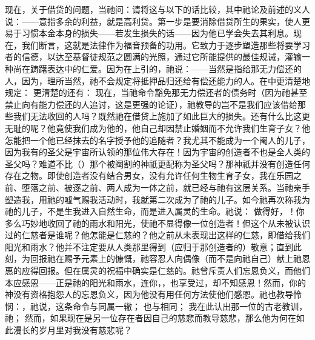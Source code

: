 现在，关于借贷的问题，当祂问：请将这与以下的话比较，其中祂论及前述的义人说：——意指多余的利益，就是高利贷。第一步是要消除借贷所生的果实，使人更易于习惯本金本身的损失——若发生损失的话——因为他已学会失去其利息。现在，我们断言，这就是法律作为福音预备的功用。它致力于逐步塑造那些将要学习者的信德，以达至基督徒规范之圆满的光照，通过它所能提供的最佳规诫，灌输一种尚在踌躇表达中的仁爱。因为在上引的，祂说：——当然是指给那无力偿还的人，因为，理所当然，祂不会规定将抵押品归还给有偿还能力的人。在中更清楚地规定： 更清楚的还有： 现在，当祂命令豁免那无力偿还者的债务时（因为祂甚至禁止向有能力偿还的人追讨，这是更强的论证），祂教导的岂不是我们应该借给那些我们无法收回的人吗？既然祂在借贷上施加了如此巨大的损失。还有什么比这更无耻的呢？他竟使我们成为他的，他自己却因禁止婚姻而不允许我们生育子女？他怎能把一个他已经抹去的名字授予他的追随者？我尤其不能成为一个阉人的儿子，因为我有的圣父是宇宙所认领的那位伟大存在！因为宇宙的创造者不也是全人类的圣父吗？难道不比（）那个被阉割的神祇更配称为圣父吗？那神祇并没有创造任何存在之物。即使创造者没有结合男女，没有允许任何生物生育子女，我在乐园之前、堕落之前、被逐之前、两人成为一体之前，就已经与祂有这层关系。当祂亲手塑造我，用祂的嘘气赐我活动时，我就第二次成为了祂的儿子。如今祂再次称我为祂的儿子，不是生我进入自然生命，而是进入属灵的生命。祂说： 做得好，！你多么巧妙地收回了祂的雨水和阳光，使祂不显得像一位创造者！但这个从未被认识过的仁慈者是谁呢？他怎能是仁慈的？他之前从未表现出这样的仁慈，即借给我们阳光和雨水？他并不注定要从人类那里得到（应归于那创造者的）敬意；直到此刻，为回报祂在赐予元素上的慷慨，祂容忍人向偶像（而不是向祂自己）献上祂恩惠的应得回报。但在属灵的祝福中确实是仁慈的。祂曾斥责人们忘恩负义，而他们本应感恩——正是祂的阳光和雨水，连你，，也享受过，却不知感恩！然而，你的神没有资格抱怨人的忘恩负义，因为他没有用任何方法使他们感恩。祂也教导怜悯：，祂说，这条命令与同属一辙； 也与相同； 我在此认出那一位的古老教训，祂； 然而，如果现在是另一位存在者因自己的慈悲而教导慈悲，那么他为何在如此漫长的岁月里对我没有慈悲呢？ 